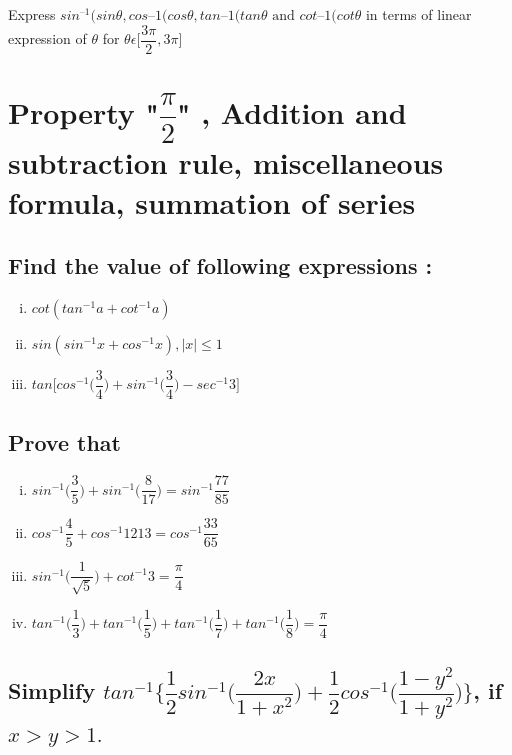 \documentclass[a4paper,10pt]{article}
\begin{document}
\subsection{}
Express $sin^{–1} (sin \theta, cos –1 (cos \theta, tan –1 (tan \theta
\text{ and } cot –1 (cot
\theta$ in terms of linear expression of $\theta$ for $\theta
\epsilon\bigg[\dfrac{3\pi}{2},3\pi\bigg]$
\section{Property "$\dfrac{\pi}{2}$" , Addition and subtraction rule,
miscellaneous formula, summation of series}
\subsection{Find the value of following expressions :}
\begin{multicols}{2}     
\begin{enumerate}[(i)] 
\item $cot (tan^{-1} a+cot^{-1} a)$
\item $sin(sin^{-1}x+cos^{-1}x), |x| \leq 1$
\item
$tan\bigg[cos^{-1}\bigg(\dfrac{3}{4}\bigg)+sin^{-1}\bigg(\dfrac{3}{4}\bigg)-sec^{-1}3\bigg]$
\end{enumerate}
\end{multicols}
\subsection{Prove that}
\begin{enumerate}[(i)]  
\item
$sin^{-1}\bigg(\dfrac{3}{5}\bigg)+sin^{-1}\bigg(\dfrac{8}{17}\bigg) =
sin^{-1}\dfrac{77}{85}$
\item $cos^{-1}\dfrac{4}{5}+cos^{-1}{12}{13} = cos^{-1}\dfrac{33}{65}$
\item $sin^{-1}\bigg(\dfrac{1}{\sqrt{5}}\bigg)+cot^{-1}3 =
\dfrac{\pi}{4}$
\item
$tan^{-1}\bigg(\dfrac{1}{3}\bigg)+tan^{-1}\bigg(\dfrac{1}{5}\bigg)+tan^{-1}\bigg(\dfrac{1}{7}\bigg)+tan^{-1}\bigg(\dfrac{1}{8}\bigg)
= \dfrac{\pi}{4}$
\end{enumerate}
\subsection{Simplify
$tan^{-1}\bigg\{\dfrac{1}{2}sin^{-1}\bigg(\dfrac{2x}{1+x^2}\bigg)+\dfrac{1}{2}cos^{-1}\bigg(\dfrac{1-y^2}{1+y^2}\bigg)\bigg\}$,
if $x > y > 1.$} 
\vspace{4mm}
\end{document}
